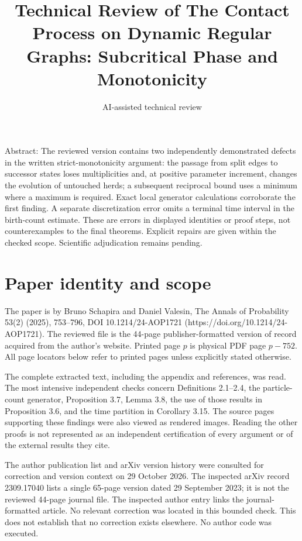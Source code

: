 \documentclass[10pt]{article}
\title{Technical Review of
The Contact Process on Dynamic Regular Graphs:
Subcritical Phase and Monotonicity}
\author{AI-assisted technical review}
\date{}
\begin{document}
\maketitle
Abstract: The reviewed version contains two independently demonstrated defects in the written strict-monotonicity argument: the passage from split edges to successor states loses multiplicities and, at positive parameter increment, changes the evolution of untouched herds; a subsequent reciprocal bound uses a minimum where a maximum is required. Exact local generator calculations corroborate the first finding. A separate discretization error omits a terminal time interval in the birth-count estimate. These are errors in displayed identities or proof steps, not counterexamples to the final theorems. Explicit repairs are given within the checked scope. Scientific adjudication remains pending.\par
\section*{Paper identity and scope}
The paper is by Bruno Schapira and Daniel Valesin, The Annals of Probability 53(2) (2025), 753–796, DOI 10.1214/24-AOP1721 (https://doi.org/10.1214/24-AOP1721). The reviewed file is the 44-page publisher-formatted version of record acquired from the author’s website. Printed page \(p\) is physical PDF page \(p-752\). All page locators below refer to printed pages unless explicitly stated otherwise.\par
The complete extracted text, including the appendix and references, was read. The most intensive independent checks concern Definitions 2.1–2.4, the particle-count generator, Proposition 3.7, Lemma 3.8, the use of those results in Proposition 3.6, and the time partition in Corollary 3.15. The source pages supporting these findings were also viewed as rendered images. Reading the other proofs is not represented as an independent certification of every argument or of the external results they cite.\par
The author publication list and arXiv version history were consulted for correction and version context on 29 October 2026. The inspected arXiv record 2309.17040 lists a single 65-page version dated 29 September 2023; it is not the reviewed 44-page journal file. The inspected author entry links the journal-formatted article. No relevant correction was located in this bounded check. This does not establish that no correction exists elsewhere. No author code was executed.\par
\end{document}
